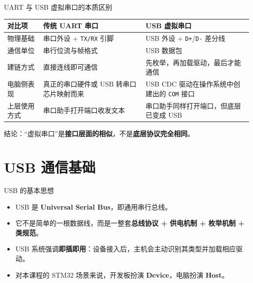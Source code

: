 \documentclass[11pt,aspectratio=169]{ctexbeamer}
\newcommand{\code}[1]{\texttt{#1}}
\newcommand{\term}[1]{\textbf{\color{PrimaryBlue}#1}}
\begin{document}
\begin{frame}{UART 与 USB 虚拟串口的本质区别}
  \small
  \begin{tabularx}{\textwidth}{>{\raggedright\arraybackslash}p{2.8cm}XX}
    \toprule
    对比项 & 传统 UART 串口 & USB 虚拟串口 \\
    \midrule
    物理基础 & 串口外设 + \code{TX/RX} 引脚 & USB 外设 + \code{D+}/\code{D-} 差分线 \\
    通信单位 & 串行位流与帧格式 & USB 数据包 \\
    建链方式 & 直接连线即可通信 & 先枚举，再加载驱动，最后才能通信 \\
    电脑侧表现 & 真正的串口硬件或 USB 转串口芯片映射而来 & USB CDC 驱动在操作系统中创建出的 \code{COM} 接口 \\
    上层使用方式 & 串口助手打开端口收发文本 & 串口助手同样打开端口，但底层已变成 USB \\
    \bottomrule
  \end{tabularx}

  \vspace{0.5em}
  \alert{结论：}“虚拟串口”是\term{接口层面的相似}，不是\term{底层协议完全相同}。
\end{frame}

\section{USB 通信基础}

\begin{frame}{USB 的基本思想}
  \begin{itemize}
    \item USB 是 \term{Universal Serial Bus}，即通用串行总线。
    \item 它不是简单的一根数据线，而是一整套\term{总线协议 + 供电机制 + 枚举机制 + 类规范}。
    \item USB 系统强调\term{即插即用}：设备接入后，主机会主动识别其类型并加载相应驱动。
    \item 对本课程的 STM32 场景来说，开发板扮演 \term{Device}，电脑扮演 \term{Host}。
  \end{itemize}
\end{frame}
\end{document}
